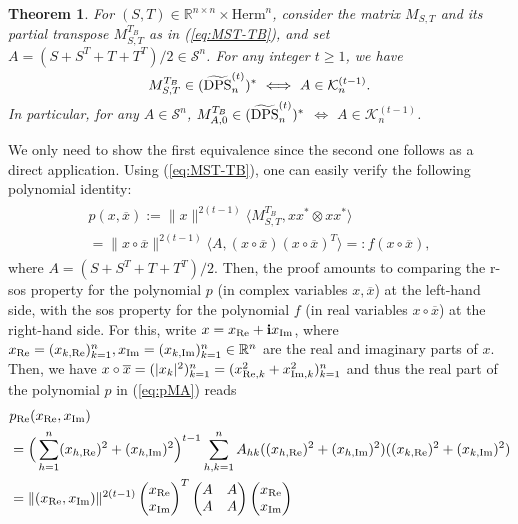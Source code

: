 \documentclass[11pt]{article}
\makeatletter
\newcommand{\R}{\ensuremath{\mathbb{R}}}   %
\newcommand{\MS}{{\mathcal S}}
\newcommand{\MK}{{\mathcal K}}
\newcommand{\Herm}{\mathrm{Herm}}
\newcommand{\DPS}{\text{\rm DPS}}
\newcommand{\tilDPSt}{\widetilde{\DPS}^{(t)}}
\newcommand{\ot}{\otimes}
\newcommand{\ovx}{\overline x}
\newcommand{\Rea}{\text{\rm Re}}
\newcommand{\Ima}{\text{\rm Im}}
\newcommand{\bfi}{\mathbf i}
\theoremstyle{plain}
\newtheorem{theorem}[satz]{Theorem}
\renewenvironment{proof}[1][\proofname]{%
  \par
  \pushQED{}%
  \normalfont
  \topsep6\p@\@plus6\p@
  \trivlist
  \item[\hskip\labelsep\itshape #1\@addpunct{.}]%
}{%
  \popQED
  \endtrivlist
}
\makeatother
\begin{document}
\begin{theorem}\label{theo:DPS-KCOP}
For $(S,T)\in\R^{n\times n}\times \Herm^n$, consider the matrix $M_{S,T}$ and its partial transpose $M_{S,T}^{T_B}$ as in (\ref{eq:MST-TB}), and set $A=(S+S^T+T+T^T)/2\in\MS^n$.
 For any integer $t\ge 1$, we have 
 $$ M_{S,T}^{T_B}\in \smash{ (\tilDPSt_n)^* }\ \Longleftrightarrow \ A\in\MK^{(t-1)}_n.$$ 
In particular,  for any $A\in\MS^n$,    $M_{A,0}^{T_B} \in \smash{ (\tilDPSt_n)^*}$ $\Longleftrightarrow $ 
$A\in \MK^{(t-1)}_n$.
\end{theorem}



\begin{proof}
We only need to show the first equivalence since the second one follows as a direct application. Using (\ref{eq:MST-TB}), one can easily verify the following polynomial identity:
\begin{align}\label{eq:pMA}
\begin{split}
p(x,\ovx):= \|x\|^{2(t-1)} \langle M_{S,T}^{T_B}, xx^*\ot xx^*\rangle \\
=\|x\circ \ovx\|^{2(t-1)} \langle A, (x\circ \ovx) (x\circ \ovx)^T\rangle=: f(x\circ \ovx),
\end{split} \end{align}
where $A=(S+S^T+T+T^T)/2$.  Then, the proof amounts to comparing the r-sos property for the polynomial $p$  
(in complex variables $x,\ovx$) at the left-hand side, with the sos property for the polynomial $f$
 (in real variables $x\circ \ovx$) at the right-hand side.
For this, write $x=x_{\Rea}+\bfi x_{\Ima}$, where $x_\Rea=(x_{k,\Rea})_{k=1}^n, x_{\Ima}=(x_{k, \Ima})_{k=1}^n \in \R^n$ are the real and imaginary parts of $x$.
Then, we have $x\circ \ovx= (|x_k|^2)_{k=1}^n=(x_{\Rea,k}^2+x_{\Ima,k}^2)_{k=1}^n$ and thus 
the real part of the polynomial $p$ in (\ref{eq:pMA}) reads
\begin{align*} 
& p_\Rea(x_\Rea,x_\Ima) \\
& = \Big(\sum_{h=1}^n (x_{h,\Rea})^2+(x_{h,\Ima})^2\Big)^{t-1}
\sum_{h,k=1}^n A_{hk} ((x_{h,\Rea})^2+(x_{h, \Ima})^2)
 ((x_{k,\Rea})^2+(x_{k,\Ima})^2)\\
 & =  \|(x_{\Rea},x_{\Ima})\|^{2(t-1)} \begin{pmatrix} x_{\Rea}\cr x_{\Ima}\end{pmatrix}^T  \begin{pmatrix} A & A \cr A& A\end{pmatrix}   \begin{pmatrix} x_{\Rea}\cr x_{\Ima}\end{pmatrix}\\

\end{align*}
\end{proof}
\end{document}
